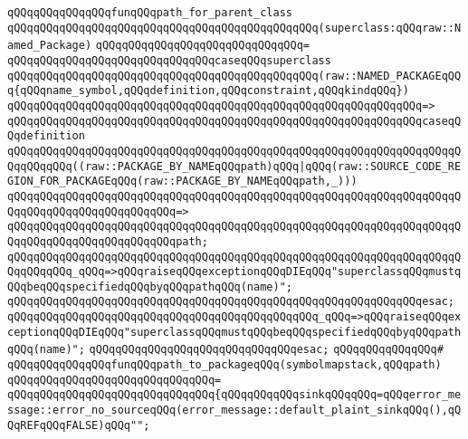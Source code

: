 \verb|qQQqqQQqqQQqqQQqfunqQQqpath_for_parent_class|\newline
\verb|qQQqqQQqqQQqqQQqqQQqqQQqqQQqqQQqqQQqqQQqqQQqqQQq(superclass:qQQqraw::Named_Package)|\newline
\verb|qQQqqQQqqQQqqQQqqQQqqQQqqQQqqQQq=|\newline
\verb|qQQqqQQqqQQqqQQqqQQqqQQqqQQqqQQqcaseqQQqsuperclass|\newline
\verb|qQQqqQQqqQQqqQQqqQQqqQQqqQQqqQQqqQQqqQQqqQQqqQQq(raw::NAMED_PACKAGEqQQq{qQQqname_symbol,qQQqdefinition,qQQqconstraint,qQQqkindqQQq})|\newline
\verb|qQQqqQQqqQQqqQQqqQQqqQQqqQQqqQQqqQQqqQQqqQQqqQQqqQQqqQQqqQQqqQQq=>|\newline
\verb|qQQqqQQqqQQqqQQqqQQqqQQqqQQqqQQqqQQqqQQqqQQqqQQqqQQqqQQqqQQqqQQqcaseqQQqdefinition|\newline
\verb|qQQqqQQqqQQqqQQqqQQqqQQqqQQqqQQqqQQqqQQqqQQqqQQqqQQqqQQqqQQqqQQqqQQqqQQqqQQqqQQq((raw::PACKAGE_BY_NAMEqQQqpath)qQQq|\verb#|qQQq(raw::SOURCE_CODE_REGION_FOR_PACKAGEqQQq(raw::PACKAGE_BY_NAMEqQQqpath,_)))#\newline
\verb|qQQqqQQqqQQqqQQqqQQqqQQqqQQqqQQqqQQqqQQqqQQqqQQqqQQqqQQqqQQqqQQqqQQqqQQqqQQqqQQqqQQqqQQqqQQqqQQq=>|\newline
\verb|qQQqqQQqqQQqqQQqqQQqqQQqqQQqqQQqqQQqqQQqqQQqqQQqqQQqqQQqqQQqqQQqqQQqqQQqqQQqqQQqqQQqqQQqqQQqqQQqpath;|\newline
\newline
\verb|qQQqqQQqqQQqqQQqqQQqqQQqqQQqqQQqqQQqqQQqqQQqqQQqqQQqqQQqqQQqqQQqqQQqqQQqqQQqqQQq_qQQq=>qQQqraiseqQQqexceptionqQQqDIEqQQq"superclassqQQqmustqQQqbeqQQqspecifiedqQQqbyqQQqpathqQQq(name)";|\newline
\verb|qQQqqQQqqQQqqQQqqQQqqQQqqQQqqQQqqQQqqQQqqQQqqQQqqQQqqQQqqQQqqQQqesac;|\newline
\verb|qQQqqQQqqQQqqQQqqQQqqQQqqQQqqQQqqQQqqQQqqQQqqQQq_qQQq=>qQQqraiseqQQqexceptionqQQqDIEqQQq"superclassqQQqmustqQQqbeqQQqspecifiedqQQqbyqQQqpathqQQq(name)";|\newline
\verb|qQQqqQQqqQQqqQQqqQQqqQQqqQQqqQQqesac;|\newline
\newline
\verb|qQQqqQQqqQQqqQQq#|\newline
\verb|qQQqqQQqqQQqqQQqfunqQQqpath_to_packageqQQq(symbolmapstack,qQQqpath)|\newline
\verb|qQQqqQQqqQQqqQQqqQQqqQQqqQQqqQQq=|\newline
\verb|qQQqqQQqqQQqqQQqqQQqqQQqqQQqqQQq{qQQqqQQqqQQqsinkqQQqqQQq=qQQqerror_message::error_no_sourceqQQq(error_message::default_plaint_sinkqQQq(),qQQqREFqQQqFALSE)qQQq"";|\newline
